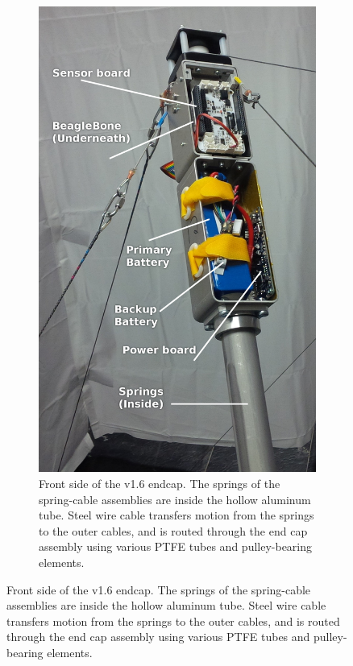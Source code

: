 \documentclass[12pt]{report}
\begin{document}
\begin{figure}
  \centering
  \begin{subfigure}[b]{0.4\textwidth}
    \includegraphics[width=1\textwidth]{img/endcap_upclose_sensorboard_labelled.jpg}
    \caption{Front side of the v1.6 endcap. The springs of the spring-cable assemblies are inside the hollow aluminum tube. Steel wire cable transfers motion from the springs to the outer cables, and is routed through the end cap assembly using various PTFE tubes and pulley-bearing elements.}
    \label{fig:final_endcap_front}
  \end{subfigure}

\end{figure}
\end{document}
